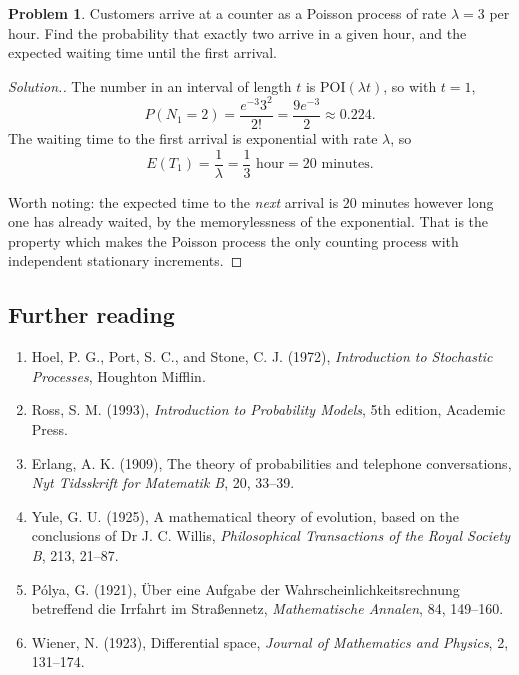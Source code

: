 \documentclass[12pt,a4paper]{report}
\theoremstyle{definition}
\newtheorem{problemx}{Problem}[section]
\newenvironment{problem}{\begin{problemx}}{\end{problemx}}
\newenvironment{solution}
  {\renewcommand{\qedsymbol}{}\begin{proof}[\textit{Solution}.]}
  {\end{proof}}
\begin{document}
\begin{problem}
Customers arrive at a counter as a Poisson process of rate $\lambda = 3$ per
hour. Find the probability that exactly two arrive in a given hour, and the
expected waiting time until the first arrival.
\end{problem}
\begin{solution}
The number in an interval of length $t$ is POI$(\lambda t)$, so with $t=1$,
\[P(N_1 = 2) = \frac{e^{-3}3^{2}}{2!} = \frac{9e^{-3}}{2} \approx 0.224 .\]
The waiting time to the first arrival is exponential with rate $\lambda$, so
\[E(T_1) = \frac{1}{\lambda} = \frac13 \text{ hour} = 20 \text{ minutes}.\]

Worth noting: the expected time to the \emph{next} arrival is $20$ minutes
however long one has already waited, by the memorylessness of the exponential.
That is the property which makes the Poisson process the only counting process
with independent stationary increments.
\end{solution}

\subsection*{Further reading}
\begin{enumerate}
\item Hoel, P. G., Port, S. C., and Stone, C. J. (1972), \emph{Introduction to Stochastic
Processes}, Houghton Mifflin.
\item Ross, S. M. (1993), \emph{Introduction to Probability Models}, 5th edition, Academic Press.
\item Erlang, A. K. (1909), The theory of probabilities and telephone conversations,
\emph{Nyt Tidsskrift for Matematik B}, 20, 33--39.
\item Yule, G. U. (1925), A mathematical theory of evolution, based on the conclusions of
Dr J. C. Willis, \emph{Philosophical Transactions of the Royal Society B}, 213, 21--87.
\item P\'olya, G. (1921), \"Uber eine Aufgabe der Wahrscheinlichkeitsrechnung betreffend die
Irrfahrt im Stra\ss ennetz, \emph{Mathematische Annalen}, 84, 149--160.
\item Wiener, N. (1923), Differential space, \emph{Journal of Mathematics and Physics}, 2,
131--174.
\end{enumerate}
\end{document}
